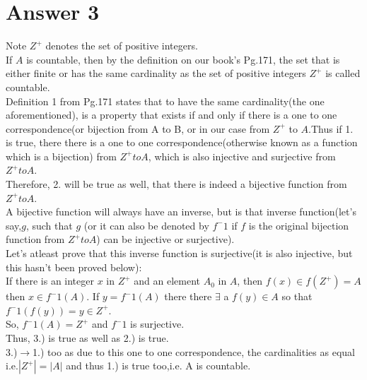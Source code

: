 \documentclass[11pt]{article}
\begin{document}
\section*{Answer 3}
Note $Z^+$ denotes the set of positive integers.\\If $A$ is countable, then by the definition on our book's Pg.171, the set that is either finite or has the same cardinality as the set of positive integers $Z^+$ is called countable.\\
Definition 1 from Pg.171 states that to have the same cardinality(the one aforementioned), is a property that exists if and only if there is a one to one correspondence(or bijection from A to B, or in our case from $Z^+$ to $A$.Thus if 1. is true, there there is a one to one correspondence(otherwise known as a function which is a bijection) from $Z^+ to A$, which is also injective and surjective from $Z^+ to A$.\\ Therefore, 2. will be true as well, that there is indeed a bijective function from $Z^+ to A$.\\
A bijective function will always have an inverse, but is that inverse function(let's say,$g$, such that $g$ (or it can also be denoted by $f^-1$ if $f$ is the original bijection function from $Z^+ to A$) can be injective or surjective).\\
Let's atleast prove that this inverse function is surjective(it is also injective, but this hasn't been proved below):\\
If there is an integer $x$ in $Z^+$ and an element $A_0$ in $A$, then $f(x) \in f(Z^+) = A$ then $x \in f^-1(A).$ If $y = f^-1(A)$ there there $\exists$ a $f(y) \in A$ so that $f^-1(f(y))=y \in Z^+$.\\
So, $f^-1(A)=Z^+$ and $f^-1$ is surjective.\\
Thus, 3.) is true as well as 2.) is true.\\
3.)$\rightarrow$1.) too as due to this one to one correspondence, the cardinalities as equal i.e.$|Z^+| = |A|$ and thus 1.) is true too,i.e. A is countable.\\
\end{document}

